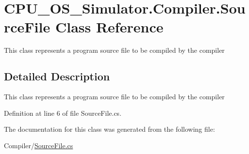 \hypertarget{class_c_p_u___o_s___simulator_1_1_compiler_1_1_source_file}{}\section{C\+P\+U\+\_\+\+O\+S\+\_\+\+Simulator.\+Compiler.\+Source\+File Class Reference}
\label{class_c_p_u___o_s___simulator_1_1_compiler_1_1_source_file}


This class represents a program source file to be compiled by the compiler  




\subsection{Detailed Description}
This class represents a program source file to be compiled by the compiler 



Definition at line 6 of file Source\+File.\+cs.



The documentation for this class was generated from the following file\+:\begin{DoxyCompactItemize}
\item 
Compiler/\hyperlink{_source_file_8cs}{Source\+File.\+cs}\end{DoxyCompactItemize}
